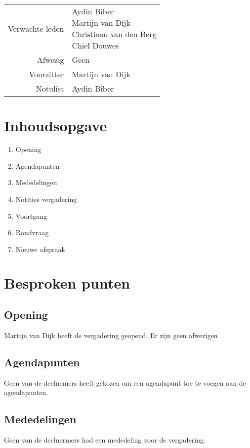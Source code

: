 \documentclass[dutch]{hu}
\subtitle{Notule 25-11-2015}
\begin{document}
\maketitle
\pagestyle{plain}

\begin{tabular}{ r | l }
Verwachte leden & \makecell[l]{
	Aydin Biber \\
	Martijn van Dijk \\
	Christiaan van den Berg \\
	Chiel Douwes
	} \\
Afwezig & Geen \\
Voorzitter & Martijn van Dijk \\
Notulist & Aydin Biber \\
\end{tabular}

\chapter{Inhoudsopgave}
\begin{enumerate}
\item Opening
\item Agendapunten
\item Mededelingen
\item Notities vergadering
\item Voortgang
\item Rondvraag
\item Nieuwe afspraak
\end{enumerate}

\chapter{Besproken punten}
\section{Opening}
Martijn van Dijk heeft de vergadering geopend. Er zijn geen afwezigen

\section{Agendapunten}
Geen van de deelnemers heeft gekozen om een agendapunt toe te voegen aan de agendapunten.

\section{Mededelingen}
Geen van de deelnermers had een mededeling voor de vergadering.
\end{document}
